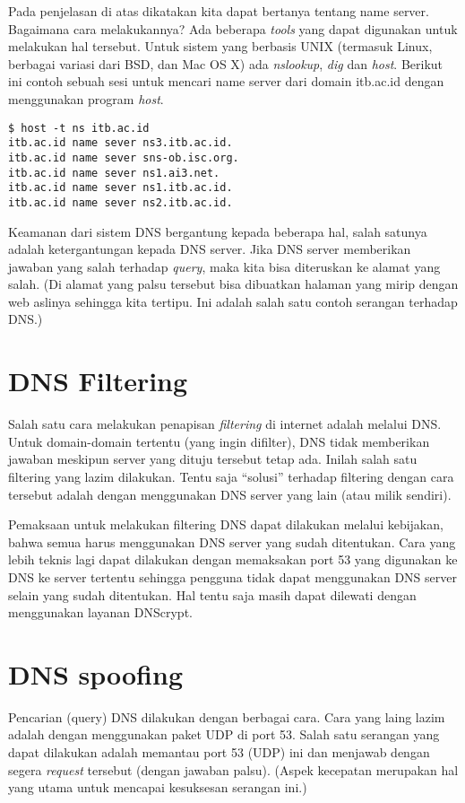 Pada penjelasan di atas dikatakan kita dapat bertanya tentang name server.
Bagaimana cara melakukannya? Ada beberapa {\em tools} yang dapat digunakan
untuk melakukan hal tersebut. Untuk sistem yang berbasis UNIX (termasuk Linux,
berbagai variasi dari BSD, dan Mac OS X) ada {\em nslookup}, {\em dig} dan {\em host}.
Berikut ini contoh sebuah sesi untuk mencari name server dari domain itb.ac.id
dengan menggunakan program {\em host}.

\begin{verbatim}
$ host -t ns itb.ac.id
itb.ac.id name sever ns3.itb.ac.id.
itb.ac.id name sever sns-ob.isc.org.
itb.ac.id name sever ns1.ai3.net.
itb.ac.id name sever ns1.itb.ac.id.
itb.ac.id name sever ns2.itb.ac.id.
\end{verbatim}

Keamanan dari sistem DNS bergantung kepada beberapa hal, salah satunya adalah
ketergantungan kepada DNS server. Jika DNS server memberikan jawaban yang salah
terhadap {\em query}, maka kita bisa diteruskan ke alamat yang salah. (Di
alamat yang palsu tersebut bisa dibuatkan halaman yang mirip dengan web aslinya
sehingga kita tertipu. Ini adalah salah satu contoh serangan terhadap DNS.)


\section{DNS Filtering}
Salah satu cara melakukan penapisan {\em filtering} di internet adalah melalui
DNS. Untuk domain-domain tertentu (yang ingin difilter), DNS tidak memberikan
jawaban meskipun server yang dituju tersebut tetap ada. Inilah salah satu
filtering yang lazim dilakukan.
Tentu saja ``solusi'' terhadap filtering dengan cara tersebut adalah dengan 
menggunakan DNS server yang lain (atau milik sendiri).

Pemaksaan untuk melakukan filtering DNS dapat dilakukan melalui kebijakan,
bahwa semua harus menggunakan DNS server yang sudah ditentukan. Cara yang lebih
teknis lagi dapat dilakukan dengan memaksakan port 53 yang digunakan ke DNS ke
server tertentu sehingga pengguna tidak dapat menggunakan DNS server selain
yang sudah ditentukan. Hal tentu saja masih dapat dilewati dengan menggunakan
layanan DNScrypt.


\section{DNS spoofing}
Pencarian (query) DNS dilakukan dengan berbagai cara. Cara yang laing lazim
adalah dengan menggunakan paket UDP di port 53. Salah satu serangan yang dapat
dilakukan adalah memantau port 53 (UDP) ini dan menjawab dengan segera {\em
request} tersebut (dengan jawaban palsu). (Aspek kecepatan merupakan hal yang
utama untuk mencapai kesuksesan serangan ini.)

